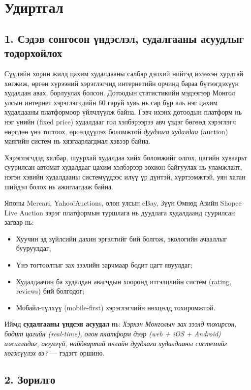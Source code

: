 \documentclass[12pt, a4paper]{report}
\begin{document}
\chapter*{Удиртгал}

\section*{1. Сэдэв сонгосон үндэслэл, судалгааны асуудлыг тодорхойлох}

Сүүлийн хорин жилд цахим худалдааны салбар дэлхий нийтэд ихээхэн хурдтай хөгжиж, өргөн хүрээний хэрэглэгчид интернетийн орчинд бараа бүтээгдэхүүн худалдан авах, борлуулах болсон. Дотоодын статистикийн мэдээгээр Монгол улсын интернет хэрэглэгчдийн 60 гаруй хувь нь сар бүр аль нэг цахим худалдааны платформоор үйлчлүүлж байна. Гэвч ихэнх дотоодын платформ нь нэг үнийн (fixed price) худалдааг гол хэлбэрээрээ авч үздэг бөгөөд хэрэглэгч өөрсдөө үнэ тогтоох, өрсөлдүүлэх боломжтой \textit{дуудлага худалдаа} (auction) маягийн систем нь хязгаарлагдмал хэвээр байна.

Хэрэглэгчдэд хялбар, шуурхай худалдаа хийх боломжийг олгох, цагийн хуваарьт суурилсан автомат худалдааг цахим хэлбэрээр зохион байгуулах нь уламжлалт, нэгэн хэвийн худалдааны системүүдээс илүү үр дүнтэй, хүртээмжтэй, уян хатан шийдэл болох нь ажиглагдаж байна.

Японы Mercari, Yahoo!Auctions, олон улсын eBay, Зүүн Өмнөд Азийн Shopee Live Auction зэрэг платформын туршлага нь дуудлага худалдаанд суурилсан загвар нь:

\begin{itemize}
  \item Хуучин эд зүйлсийн дахин эргэлтийг бий болгож, экологийн ачааллыг бууруулдаг;
  \item Үнэ тогтоолтыг зах зээлийн зарчмаар бодит цагт явуулдаг;
  \item Худалдаачин ба худалдан авагчдын хооронд итгэлцлийн систем (rating, reviews) бий болгодог;
  \item Мобайл-түлхүү (mobile-first) хэрэглэгчийн нөхцөлд тохиромжтой.
\end{itemize}

Иймд \textbf{судалгааны үндсэн асуудал} нь: \textit{Хэрхэн Монголын зах зээлд тохирсон, бодит цагийн (real-time), олон платформ дээр (web + iOS + Android) ажилладаг, аюулгүй, найдвартай онлайн дуудлага худалдааны системийг хөгжүүлэх вэ?} — гэдэгт оршино.

\section*{2. Зорилго}
\end{document}

